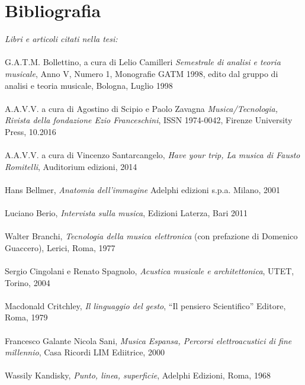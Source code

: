 
\chapter*{Bibliografia}
\label{chp:Bibliografia}
\textit{Libri e articoli citati nella tesi:} \\
\\
G.A.T.M. Bollettino, a cura di Lelio Camilleri \textit{Semestrale di analisi e teoria musicale}, Anno V, Numero 1, Monografie GATM 1998, edito dal gruppo di analisi e teoria musicale, Bologna, Luglio 1998 \\
\\
A.A.V.V. a cura di Agostino di Scipio e Paolo Zavagna \textit{Musica/Tecnologia, Rivista della fondazione Ezio Franceschini}, ISSN 1974-0042, Firenze University Press, 10.2016 \\
\\
A.A.V.V. a cura di Vincenzo Santarcangelo, \textit{Have your trip, La musica di Fausto Romitelli}, Auditorium edizioni, 2014 \\
\\
Hans Bellmer, \textit{Anatomia dell’immagine} Adelphi edizioni s.p.a. Milano, 2001 \\
\\
Luciano Berio, \textit{Intervista sulla musica}, Edizioni Laterza, Bari 2011 \\
\\
Walter Branchi, \textit{Tecnologia della musica elettronica} (con prefazione di Domenico Guaccero), Lerici, Roma, 1977 \\
\\
Sergio Cingolani e Renato Spagnolo, \textit{Acustica musicale e architettonica}, UTET, Torino, 2004 \\
\\
Macdonald Critchley, \textit{Il linguaggio del gesto}, “Il pensiero Scientifico” Editore, Roma, 1979 \\
\\
Francesco Galante Nicola Sani, \textit{Musica Espansa, Percorsi elettroacustici di fine millennio}, Casa Ricordi LIM Ediitrice, 2000 \\
\\
Wassily Kandisky, \textit{Punto, linea, superficie}, Adelphi Edizioni, Roma, 1968 \\
\\
